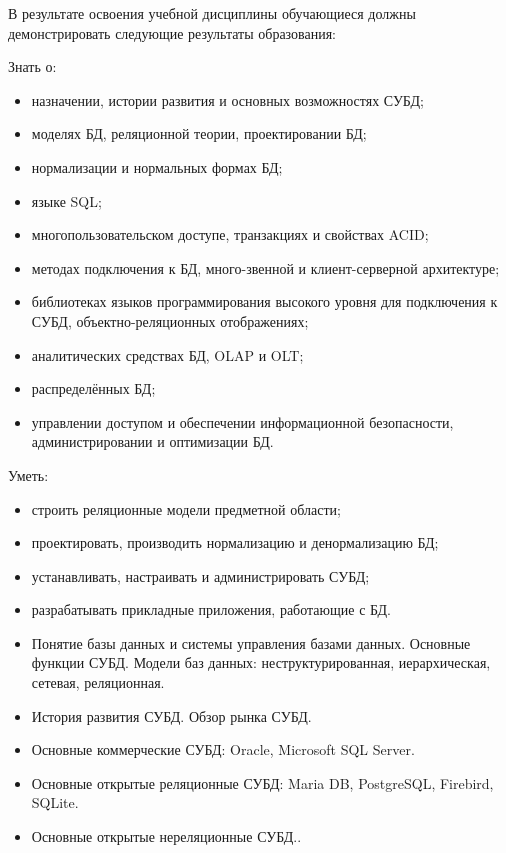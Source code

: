 \documentclass[a4paper]{article}
\begin{document}
\begin{itemize}
\end{itemize}

В результате освоения учебной дисциплины обучающиеся должны демонстрировать следующие результаты образования:

Знать о:
\begin{itemize}
  \item назначении, истории развития и основных возможностях СУБД;
  \item моделях БД, реляционной теории, проектировании БД;
  \item нормализации и нормальных формах БД;
  \item языке SQL;
  \item многопользовательском доступе, транзакциях и свойствах ACID;
  \item методах подключения к БД, много-звенной и клиент-серверной архитектуре;
  \item библиотеках языков программирования высокого уровня для подключения к СУБД, объектно-реля\-цион\-ных отображениях;
  \item аналитических средствах БД, OLAP и OLT;
  \item распределённых БД;
  \item управлении доступом и обеспечении информационной безопасности, администрировании и оптимизации БД.
\end{itemize}

Уметь:
\begin{itemize}
  \item строить реляционные модели предметной области;
  \item проектировать, производить нормализацию и денормализацию БД;
  \item устанавливать, настраивать и администрировать СУБД;
  \item разрабатывать прикладные приложения, работающие с БД.
\end{itemize}

\CourseTheorySection


\begin{itemize}
  \item Понятие базы данных и системы управления базами данных. Основные функции СУБД.
    Модели баз данных: неструктурированная, иерархическая, сетевая, реляционная.
  \item История развития СУБД. Обзор рынка СУБД.
  \item Основные коммерческие СУБД: Oracle, Microsoft SQL Server.
  \item Основные открытые реляционные СУБД: Maria DB, PostgreSQL, Firebird, SQLite.
  \item Основные открытые нереляционные СУБД..
\end{itemize}
\end{document}
